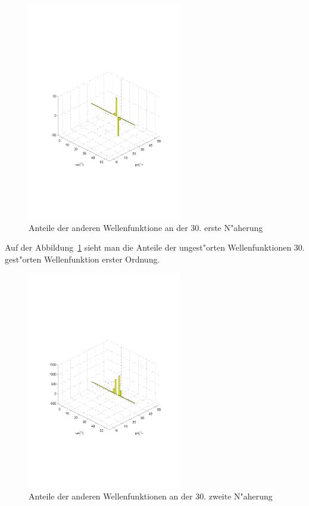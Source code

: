 \begin{refsection}
\begin{figure}[h]	%
\centering
\includegraphics[width=0.6\textwidth]{anharmonisch/images/x3/PLK(1)Single30(1Stoerung).pdf}
\caption{Anteile der anderen Wellenfunktione an der 30. erste N"aherung
\label{skript:x3_PLK(1)Single30(1Stoerung)}}
\end{figure}

Auf der Abbildung~\ref{skript:x3_PLK(1)Single30(1Stoerung)} sieht man die Anteile der ungest"orten Wellenfunktionen 30. gest"orten Wellenfunktion erster Ordnung. 

\begin{figure}[h]	%
\centering
\includegraphics[width=0.6\textwidth]{anharmonisch/images/x3/PLK(1)Single30(2Stoerung).pdf}
\caption{Anteile der anderen Wellenfunktionen an der 30. zweite N"aherung
\label{skript:x3_PLK(1)Single30(2Stoerung)}}
\end{figure}


\end{refsection}
